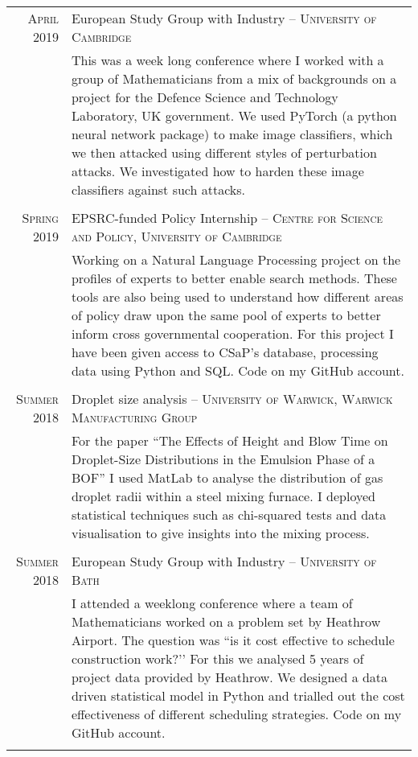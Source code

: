 \documentclass[a4paper,10pt]{article}
\begin{document}
\begin{tabular}{r|p{15.3cm}}
	\textsc{April 2019} & European Study Group with Industry -- \textsc{University of Cambridge} \\&\footnotesize{This was a week long conference where I worked with a group of Mathematicians from a mix of backgrounds on a project for the Defence Science and Technology Laboratory, UK government. We used PyTorch (a python neural network package) to make image classifiers, which we then attacked using different styles of perturbation attacks. We investigated how to harden these image classifiers against such attacks.}\\\multicolumn{2}{c}{} \\
	\textsc{Spring 2019} & EPSRC-funded Policy Internship -- \textsc{Centre for Science and Policy, University of Cambridge}\\&\footnotesize{Working on a Natural Language Processing project on the profiles of experts to better enable search methods. These tools are also being used to understand how different areas of policy draw upon the same pool of experts to better inform cross governmental cooperation. For this project I have been given access to CSaP's database, processing data using Python and SQL. Code on my GitHub account.}\\\multicolumn{2}{c}{} \\
	\textsc{Summer 2018}& Droplet size analysis -- \textsc{University of Warwick, Warwick Manufacturing Group}\\&\footnotesize{For the paper ``The Effects of Height and Blow Time on Droplet-Size Distributions in the Emulsion Phase of a BOF'' I used MatLab to analyse the distribution of gas droplet radii within a steel mixing furnace. I deployed statistical techniques such as chi-squared tests and data visualisation to give insights into the mixing process.}\\\multicolumn{2}{c}{} \\
	\textsc{Summer 2018} & European Study Group with Industry -- \textsc{University of Bath} \\&\footnotesize{I attended a weeklong conference where a team of Mathematicians worked on a problem set by Heathrow Airport. The question was ``is it cost effective to schedule construction work?’’ For this we analysed 5 years of project data provided by Heathrow. We designed a data driven statistical model in Python and trialled out the cost effectiveness of different scheduling strategies. Code on my GitHub account.}\\\multicolumn{2}{c}{} \\

\end{tabular}
\end{document}
